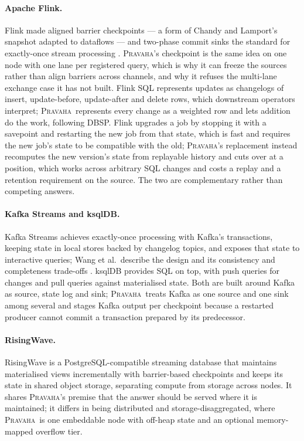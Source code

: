 \documentclass[11pt,a4paper]{article}
\renewcommand{\_}{\oldunderscore\allowbreak}
\newcommand{\Pv}{\textsc{Pravaha}}
\begin{document}
\paragraph{Apache Flink.} Flink \cite{carbone2015} made aligned barrier checkpoints --- a form of Chandy
and Lamport's snapshot \cite{chandy1985} adapted to dataflows \cite{carbone2015abs} --- and two-phase
commit sinks the standard for exactly-once stream processing \cite{carbone2017}. \Pv's checkpoint is the
same idea on one node with one lane per registered query, which is why it can freeze the sources rather
than align barriers across channels, and why it refuses the multi-lane exchange case it has not built.
Flink SQL represents updates as changelogs of insert, update-before, update-after and delete rows, which
downstream operators interpret; \Pv\ represents every change as a weighted row and lets addition do the
work, following DBSP. Flink upgrades a job by stopping it with a savepoint and restarting the new job
from that state, which is fast and requires the new job's state to be compatible with the old; \Pv's
replacement instead recomputes the new version's state from replayable history and cuts over at a
position, which works across arbitrary SQL changes and costs a replay and a retention requirement on
the source. The two are complementary rather than competing answers.

\paragraph{Kafka Streams and ksqlDB.} Kafka Streams achieves exactly-once processing with Kafka's
transactions, keeping state in local stores backed by changelog topics, and exposes that state to
interactive queries; Wang et al.\ describe the design and its consistency and completeness trade-offs
\cite{wang2021}. ksqlDB \cite{ksql2019} provides SQL on top, with push queries for changes and pull
queries against materialised state. Both are built around Kafka as source, state log and sink; \Pv\
treats Kafka as one source and one sink among several and stages Kafka output per checkpoint because a
restarted producer cannot commit a transaction prepared by its predecessor.

\paragraph{RisingWave.} RisingWave \cite{risingwave} is a PostgreSQL-compatible streaming database that
maintains materialised views incrementally with barrier-based checkpoints and keeps its state in shared
object storage, separating compute from storage across nodes. It shares \Pv's premise that the answer
should be served where it is maintained; it differs in being distributed and storage-disaggregated,
where \Pv\ is one embeddable node with off-heap state and an optional memory-mapped overflow tier.
\end{document}
